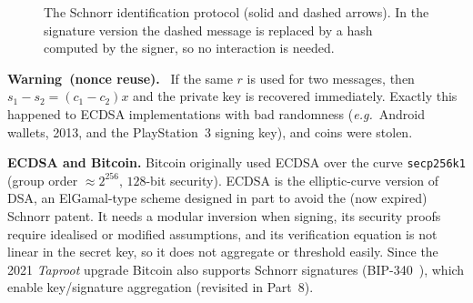 \documentclass[11pt,a4paper]{article}
\newenvironment{warnbox}[1][]{\par\medskip\noindent\textbf{Warning\if\relax\detokenize{#1}\relax\else\ #1\fi.}\ \ignorespaces}{\par\medskip}
\theoremstyle{definition}
\theoremstyle{plain}
\theoremstyle{remark}
\newcommand{\Hash}{\mathsf{H}}
\newcommand{\concat}{\,\|\,}
\newcommand{\eg}{\textit{e.g.}}
\begin{document}
\begin{figure}[htbp]
\centering
{}
\caption{The Schnorr identification protocol (solid and dashed arrows). In the signature version the dashed message is replaced by a hash computed by the signer, so no interaction is needed.}
\end{figure}

\begin{warnbox}[(nonce reuse)]
If the same $r$ is used for two messages, then $s_1-s_2=(c_1-c_2)x$ and the private key is recovered immediately.
Exactly this happened to ECDSA implementations with bad randomness (\eg\ Android wallets, 2013, and the PlayStation~3 signing key), and coins were stolen.
\end{warnbox}

\textbf{ECDSA and Bitcoin.} Bitcoin originally used ECDSA over the curve \texttt{secp256k1} (group order $\approx2^{256}$, $128$-bit security). ECDSA is the elliptic-curve version of DSA, an ElGamal-type scheme designed in part to avoid the (now expired) Schnorr patent. It needs a modular inversion when signing, its security proofs require idealised or modified assumptions, and its verification equation is not linear in the secret key, so it does not aggregate or threshold easily.
Since the 2021 \emph{Taproot} upgrade Bitcoin also supports Schnorr signatures (BIP-340~\cite{BIP340}), which enable key/signature aggregation (revisited in Part~8).
\end{document}
